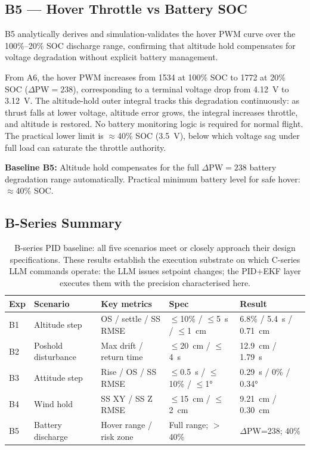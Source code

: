 \subsection{B5 --- Hover Throttle vs Battery SOC}
\label{sec:ch3_b5}

B5 analytically derives and simulation-validates the hover PWM curve over the
100\%--20\% SOC discharge range, confirming that altitude hold compensates for
voltage degradation without explicit battery management.

From A6, the hover PWM increases from 1534 at 100\% SOC to 1772 at 20\% SOC
($\Delta\text{PW} = 238$), corresponding to a terminal voltage drop from
4.12~V to 3.12~V. The altitude-hold outer integral tracks this degradation
continuously: as thrust falls at lower voltage, altitude error grows, the
integral increases throttle, and altitude is restored. No battery monitoring
logic is required for normal flight. The practical lower limit is
$\approx$40\% SOC (3.5~V), below which voltage sag under full load can
saturate the throttle authority.

\textbf{Baseline B5:} Altitude hold compensates for the full
$\Delta\text{PW}=238$ battery degradation range automatically. Practical
minimum battery level for safe hover: $\approx$40\% SOC.

\subsection{B-Series Summary}
\label{sec:ch3_b_summary}

\begin{table}[ht]
  \caption{B-series PID baseline: all five scenarios meet or closely approach
    their design specifications. These results establish the execution substrate
    on which C-series LLM commands operate: the LLM issues setpoint changes;
    the PID+EKF layer executes them with the precision characterised here.}
  \label{tab:ch3_b_summary}
  \centering
  \small
  \begin{tabular}{lllll}
    \toprule
    Exp & Scenario & Key metrics & Spec & Result \\
    \midrule
    B1 & Altitude step       & OS / settle / SS RMSE & $\leq$10\% / $\leq$5~s / $\leq$1~cm & 6.8\% / 5.4~s / 0.71~cm \\
    B2 & Poshold disturbance & Max drift / return time & $\leq$20~cm / $\leq$4~s & 12.9~cm / 1.79~s \\
    B3 & Attitude step       & Rise / OS / SS RMSE     & $\leq$0.5~s / $\leq$10\% / $\leq$1° & 0.29~s / 0\% / 0.34° \\
    B4 & Wind hold           & SS XY / SS Z RMSE       & $\leq$15~cm / $\leq$2~cm & 9.21~cm / 0.30~cm \\
    B5 & Battery discharge   & Hover range / risk zone & Full range; $>$40\% & $\Delta$PW=238; 40\% \\
    \bottomrule
  \end{tabular}
\end{table}

